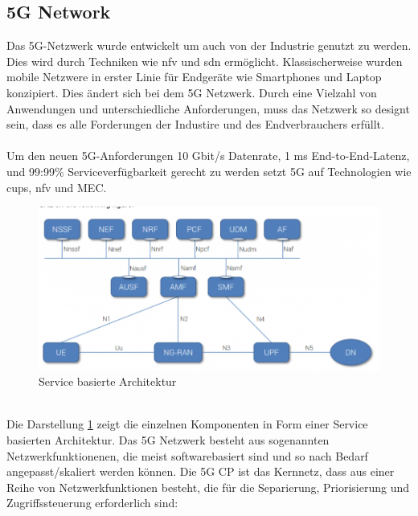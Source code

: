 \documentclass[runningheads]{llncs}
\numberwithin{figure}{section}
\begin{document}
\subsection{5G Network}
\label{subsec:5G Network}
Das 5G-Netzwerk wurde entwickelt um auch von der Industrie genutzt zu werden.
Dies wird durch Techniken wie \acrlong{nfv} und \acrlong{sdn} ermöglicht.
Klassischerweise wurden mobile Netzwere in erster Linie für Endgeräte wie Smartphones und Laptop konzipiert. 
Dies ändert sich bei dem 5G Netzwerk. Durch eine Vielzahl von Anwendungen und unterschiedliche Anforderungen,
muss das Netzwerk so designt sein, dass es alle Forderungen der Industire und des Endverbrauchers erfüllt. 
\\
\\
Um den neuen 5G-Anforderungen 10 Gbit/s Datenrate, 1 ms End-to-End-Latenz,  und 99:99\% 
Serviceverfügbarkeit gerecht zu werden setzt 5G auf Technologien wie \acrfull{cups}, \acrfull{nfv} und MEC.
\begin{figure}
  \includegraphics[width=\linewidth]{images/ServiceBased5g.png}
  \caption{Service basierte Architektur}
  \label{fig:ServiceBased5g}
\end{figure}
\\
Die Darstellung \ref{fig:ServiceBased5g} zeigt die einzelnen Komponenten in Form einer Service basierten Architektur.  \cite{5GCoreNetwork2017}
Das 5G Netzwerk besteht aus sogenannten Netzwerkfunktionenen, die meist softwarebasiert sind und so nach Bedarf angepasst/skaliert werden können.
Die 5G CP ist das Kernnetz, dass aus einer Reihe von Netzwerkfunktionen besteht, 
die für die Separierung, Priorisierung und Zugriffssteuerung erforderlich sind:
\end{document}
